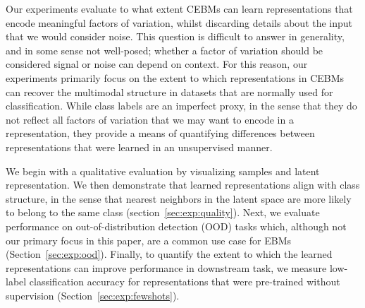 \documentclass{article}
\begin{document}
Our experiments evaluate to what extent CEBMs can learn representations that encode meaningful factors of variation, whilst discarding details about the input that we would consider noise. This question is difficult to answer in generality, and in some sense not well-posed; whether a factor of variation should be considered signal or noise can depend on context. For this reason, our experiments primarily focus on the extent to which representations in CEBMs can recover the multimodal structure in datasets that are normally used for classification. %
While class labels are an imperfect proxy, in the sense that they do not reflect all factors of variation that we may want to encode in a representation, they provide a means of quantifying differences between representations that were learned in an unsupervised manner. 

We begin with a qualitative evaluation by visualizing samples and latent representation. We then demonstrate that learned representations align with class structure, in the sense that nearest neighbors in the latent space are more likely to belong to the same class (section~\ref{sec:exp:quality}). Next, we evaluate performance on out-of-distribution detection (OOD) tasks which, although not our primary focus in this paper, are a common use case for EBMs (Section~\ref{sec:exp:ood}).  %
Finally, to quantify the extent to which the learned representations can improve performance in downstream task, we measure low-label classification accuracy for representations that were pre-trained without supervision (Section~\ref{sec:exp:fewshots}).

\end{document}
